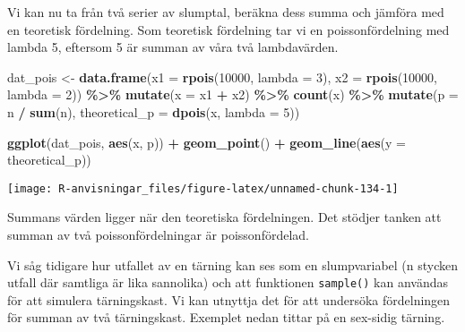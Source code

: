 \documentclass[
]{book}
\newenvironment{Shaded}{\begin{snugshade}}{\end{snugshade}}
\newcommand{\AttributeTok}[1]{\textcolor[rgb]{0.13,0.29,0.53}{#1}}
\newcommand{\DecValTok}[1]{\textcolor[rgb]{0.00,0.00,0.81}{#1}}
\newcommand{\FunctionTok}[1]{\textcolor[rgb]{0.13,0.29,0.53}{\textbf{#1}}}
\newcommand{\NormalTok}[1]{#1}
\newcommand{\OtherTok}[1]{\textcolor[rgb]{0.56,0.35,0.01}{#1}}
\newcommand{\SpecialCharTok}[1]{\textcolor[rgb]{0.81,0.36,0.00}{\textbf{#1}}}
\theoremstyle{definition}
\theoremstyle{definition}
\theoremstyle{definition}
\theoremstyle{definition}
\theoremstyle{remark}
\begin{document}
Vi kan nu ta från två serier av slumptal, beräkna dess summa och jämföra med en teoretisk fördelning. Som teoretisk fördelning tar vi en poissonfördelning med lambda 5, eftersom 5 är summan av våra två lambdavärden.

\begin{Shaded}
\begin{Highlighting}[]
\NormalTok{dat\_pois }\OtherTok{\textless{}{-}} \FunctionTok{data.frame}\NormalTok{(}\AttributeTok{x1 =} \FunctionTok{rpois}\NormalTok{(}\DecValTok{10000}\NormalTok{, }\AttributeTok{lambda =} \DecValTok{3}\NormalTok{),}
                       \AttributeTok{x2 =} \FunctionTok{rpois}\NormalTok{(}\DecValTok{10000}\NormalTok{, }\AttributeTok{lambda =} \DecValTok{2}\NormalTok{)) }\SpecialCharTok{\%\textgreater{}\%} 
  \FunctionTok{mutate}\NormalTok{(}\AttributeTok{x =}\NormalTok{ x1 }\SpecialCharTok{+}\NormalTok{ x2) }\SpecialCharTok{\%\textgreater{}\%} 
  \FunctionTok{count}\NormalTok{(x) }\SpecialCharTok{\%\textgreater{}\%} 
  \FunctionTok{mutate}\NormalTok{(}\AttributeTok{p =}\NormalTok{ n }\SpecialCharTok{/} \FunctionTok{sum}\NormalTok{(n),}
         \AttributeTok{theoretical\_p =} \FunctionTok{dpois}\NormalTok{(x, }\AttributeTok{lambda =} \DecValTok{5}\NormalTok{))}

\FunctionTok{ggplot}\NormalTok{(dat\_pois, }\FunctionTok{aes}\NormalTok{(x, p)) }\SpecialCharTok{+}
  \FunctionTok{geom\_point}\NormalTok{() }\SpecialCharTok{+}
  \FunctionTok{geom\_line}\NormalTok{(}\FunctionTok{aes}\NormalTok{(}\AttributeTok{y =}\NormalTok{ theoretical\_p))}
\end{Highlighting}
\end{Shaded}

\begin{center}\texttt{[image: R-anvisningar\_files/figure-latex/unnamed-chunk-134-1]} \end{center}

Summans värden ligger när den teoretiska fördelningen. Det stödjer tanken att summan av två poissonfördelningar är poissonfördelad.

Vi såg tidigare hur utfallet av en tärning kan ses som en slumpvariabel (n stycken utfall där samtliga är lika sannolika) och att funktionen \texttt{sample()} kan användas för att simulera tärningskast. Vi kan utnyttja det för att undersöka fördelningen för summan av två tärningskast. Exemplet nedan tittar på en sex-sidig tärning.
\end{document}
